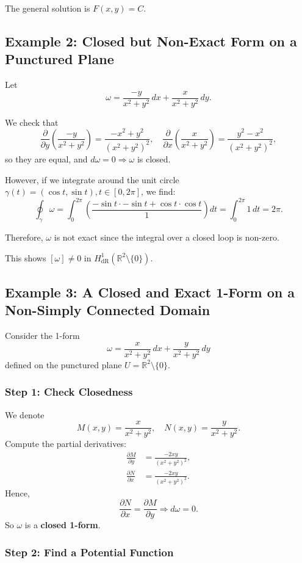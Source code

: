 \documentclass{amsart}
\theoremstyle{definition}
\theoremstyle{remark}
\numberwithin{equation}{section}
\begin{document}
The general solution is \( F(x, y) = C \).
\subsection*{Example 2: Closed but Non-Exact Form on a Punctured Plane}
Let 
\[
\omega = \frac{-y}{x^2 + y^2} \, dx + \frac{x}{x^2 + y^2} \, dy.
\]

We check that
\[
\frac{\partial}{\partial y} \left( \frac{-y}{x^2 + y^2} \right) = \frac{-x^2 + y^2}{(x^2 + y^2)^2}, \quad
\frac{\partial}{\partial x} \left( \frac{x}{x^2 + y^2} \right) = \frac{y^2 - x^2}{(x^2 + y^2)^2},
\]
so they are equal, and \( d\omega = 0 \Rightarrow \omega \) is closed.

However, if we integrate around the unit circle \( \gamma(t) = (\cos t, \sin t), t \in [0, 2\pi] \), we find:
\[
\oint_\gamma \omega = \int_0^{2\pi} \left( \frac{-\sin t \cdot -\sin t + \cos t \cdot \cos t}{1} \right) dt = \int_0^{2\pi} 1 \, dt = 2\pi.
\]

Therefore, \( \omega \) is not exact since the integral over a closed loop is non-zero.

This shows \( [\omega] \neq 0 \) in \( H^1_{\mathrm{dR}}(\mathbb{R}^2 \setminus \{0\}) \).
\subsection*{Example 3: A Closed and Exact 1-Form on a Non-Simply Connected Domain}

Consider the 1-form
\[
\omega = \frac{x}{x^2 + y^2}\, dx + \frac{y}{x^2 + y^2}\, dy
\]
defined on the punctured plane \( U = \mathbb{R}^2 \setminus \{0\} \).

\subsubsection*{Step 1: Check Closedness}

We denote
\[
M(x, y) = \frac{x}{x^2 + y^2}, \quad N(x, y) = \frac{y}{x^2 + y^2}.
\]
Compute the partial derivatives:
\begin{align*}
\frac{\partial M}{\partial y} &= \frac{-2xy}{(x^2 + y^2)^2}, \\
\frac{\partial N}{\partial x} &= \frac{-2xy}{(x^2 + y^2)^2}.
\end{align*}
Hence,
\[
\frac{\partial N}{\partial x} = \frac{\partial M}{\partial y} \Rightarrow d\omega = 0.
\]
So \( \omega \) is a \textbf{closed 1-form}.

\subsubsection*{Step 2: Find a Potential Function}
\end{document}
